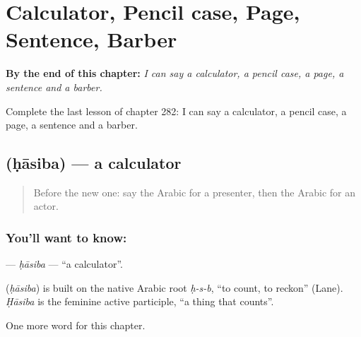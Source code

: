 
\chapter{Calculator, Pencil case, Page, Sentence, Barber}
\label{ch:ar-calculator-pencil-case-page-sentence-barber}

\begin{chapteropening}
\textbf{By the end of this chapter:} \emph{I can say a calculator, a pencil case, a page, a sentence and a barber.}

Complete the last lesson of chapter 282: I can say a calculator, a pencil case, a page, a sentence and a barber.
\end{chapteropening}

\section[\texorpdfstring{\ar{حاسبة} (ḥāsiba)}{حاسبة (ḥāsiba)}]{ (ḥāsiba) — a calculator}

\label{lesson:AR-C282-hasiba}



\begin{quote}
Before the new one: say the Arabic for a presenter, then the Arabic for an actor.
\end{quote}

\subsection*{You'll want to know: }
\textbf{} — \emph{ḥāsiba} — \textquotedblleft{}a calculator\textquotedblright{}.

\begin{cousinweb}
\textbf{} (\emph{ḥāsiba}) is built on the native Arabic root \emph{ḥ-s-b}, \textquotedblleft{}to count, to reckon\textquotedblright{} (Lane). \emph{Ḥāsiba} is the feminine active participle, \textquotedblleft{}a thing that counts\textquotedblright{}.
\end{cousinweb}

\begin{grammarlens}[title={What you've built}]
One more word for this chapter.
\end{grammarlens}

